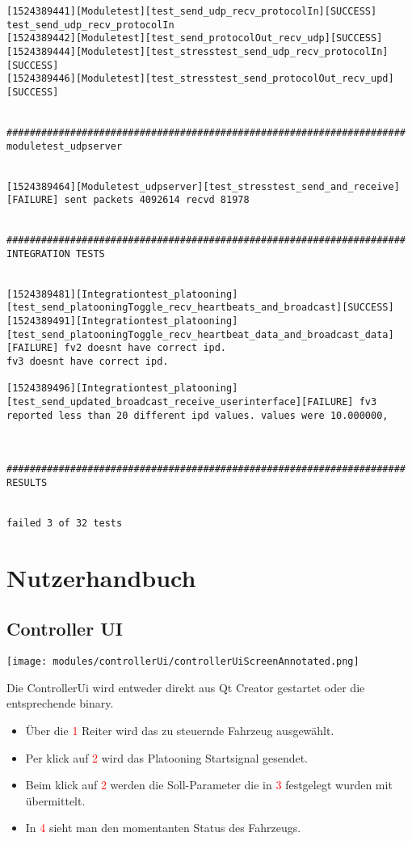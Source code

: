 \documentclass[a4paper, 12pt, titlepage]{scrartcl}
\begin{document}
{\begin{lstlisting}[basicstyle=\tiny]
[1524389441][Moduletest][test_send_udp_recv_protocolIn][SUCCESS] test_send_udp_recv_protocolIn
[1524389442][Moduletest][test_send_protocolOut_recv_udp][SUCCESS]
[1524389444][Moduletest][test_stresstest_send_udp_recv_protocolIn][SUCCESS]
[1524389446][Moduletest][test_stresstest_send_protocolOut_recv_upd][SUCCESS]


#####################################################################
moduletest_udpserver


[1524389464][Moduletest_udpserver][test_stresstest_send_and_receive][FAILURE] sent packets 4092614 recvd 81978


#####################################################################
INTEGRATION TESTS


[1524389481][Integrationtest_platooning][test_send_platooningToggle_recv_heartbeats_and_broadcast][SUCCESS]
[1524389491][Integrationtest_platooning][test_send_platooningToggle_recv_heartbeat_data_and_broadcast_data][FAILURE] fv2 doesnt have correct ipd.
fv3 doesnt have correct ipd.

[1524389496][Integrationtest_platooning][test_send_updated_broadcast_receive_userinterface][FAILURE] fv3 reported less than 20 different ipd values. values were 10.000000,



#####################################################################
RESULTS


failed 3 of 32 tests
\end{lstlisting}

	\section{Nutzerhandbuch}
	\label{nutzerhandbuch}

	\subsection*{Controller UI}
	\texttt{[image: modules/controllerUi/controllerUiScreenAnnotated.png]}

	Die ControllerUi wird entweder direkt aus Qt Creator gestartet oder die entsprechende binary.\\

	\begin{itemize}
		\item Über die \textcolor{red}{1} Reiter wird das zu steuernde Fahrzeug ausgewählt.
		\item Per klick auf \textcolor{red}{2} wird das Platooning Startsignal gesendet.
		\item Beim klick auf \textcolor{red}{2} werden die Soll-Parameter die in \textcolor{red}{3} festgelegt wurden mit übermittelt.
		\item In \textcolor{red}{4} sieht man den momentanten Status des Fahrzeugs.
	\end{itemize}

}
\end{document}
